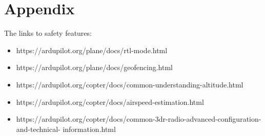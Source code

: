 \documentclass[12pt]{report}
\begin{document}
   \chapter{Appendix} 
    The links to safety features:
    \begin{itemize}
      \item https://ardupilot.org/plane/docs/rtl-mode.html
      \item https://ardupilot.org/plane/docs/geofencing.html
      \item https://ardupilot.org/copter/docs/common-understanding-altitude.html
      \item https://ardupilot.org/copter/docs/airspeed-estimation.html
      \item https://ardupilot.org/copter/docs/common-3dr-radio-advanced-configuration-and-technical-
        information.html 
    \end{itemize}

    \vspace{0.5cm}
\end{document}
